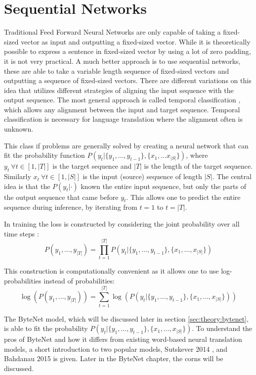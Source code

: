 \section{Sequential Networks}

Traditional Feed Forward Neural Networks are only capable of taking a fixed-sized vector as input and outputting a fixed-sized vector. While it is theoretically possible to express a sentence in fixed-sized vector by using a lot of zero padding, it is not very practical. A much better approach is to use sequential networks, these are able to take a variable length sequence of fixed-sized vectors and outputting a sequence of fixed-sized vectors. There are different variations on this idea that utilizes different strategies of aligning the input sequence with the output sequence. The most general approach is called temporal classification \cite{alexgraves}, which allows any alignment between the input and target sequence. Temporal classification is necessary for language translation where the alignment often is unknown.

This class if problems are generally solved by creating a neural network that can fit the probability function $P(y_t | \{y_1, \dots, y_{t-1}\}, \{x_1, \dots x_{|S|}\})$, where $y_t\ \forall t \in [1, |T|]$ is the target sequence and $|T|$ is the length of the target sequence. Similarly $x_t\ \forall t \in [1, |S|]$ is the input (source) sequence of length $|S|$. The central idea is that the $P(y_t| \cdot)$ known the entire input sequence, but only the parts of the output sequence that came before $y_t$. This allows one to predict the entire sequence during inference, by iterating from $t = 1$ to $t = |T|$.

In training the loss is constructed by considering the joint probability over all time steps \cite{alexgraves}:
\begin{equation}
P(y_1, \dots, y_{|T|}) = \prod_{t=1}^{|T|} P(y_t | \{y_1, \dots, y_{t-1}\}, \{x_1, \dots, x_{|S|}\})
\end{equation}

This construction is computationally convenient as it allows one to use log-probabilities instead of probabilities:
\begin{equation}
\log(P(y_1, \dots, y_{|T|})) = \sum_{t=1}^{|T|} \log(P(y_t | \{y_1, \dots, y_{t-1}\}, \{x_1, \dots, x_{|S|}\}))
\end{equation}

The ByteNet model, which will be discussed later in section \ref{sec:theory:bytenet}, is able to fit the probability $P(y_t | \{y_1, \dots, y_{t-1}\}, \{x_1, \dots, x_{|S|}\})$. To understand the pros of ByteNet and how it differs from existing word-based neural translation models, a short introduction to two popular models, Sutskever 2014 \cite{sutskever-2014-nmt}, and Bahdanau 2015 \cite{bahdanau-2015-nmt} is given. Later in the ByteNet chapter, the corns will be discussed.

